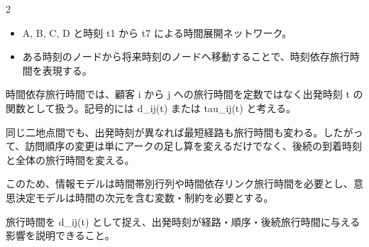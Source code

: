 

\vspace{1.5mm}

\begin{multicols}{2}

\footnotesize

\raggedcolumns


\begin{itemize}
\item A, B, C, D と時刻 t1 から t7 による時間展開ネットワーク。
\item ある時刻のノードから将来時刻のノードへ移動することで、時刻依存旅行時間を表現する。
\end{itemize}

時間依存旅行時間では、顧客 i から j への旅行時間を定数ではなく出発時刻 t の関数として扱う。記号的には d\_ij(t) または tau\_ij(t) と考える。\par

同じ二地点間でも、出発時刻が異なれば最短経路も旅行時間も変わる。したがって、訪問順序の変更は単にアークの足し算を変えるだけでなく、後続の到着時刻と全体の旅行時間を変える。\par

このため、情報モデルは時間帯別行列や時間依存リンク旅行時間を必要とし、意思決定モデルは時間の次元を含む変数・制約を必要とする。\par

旅行時間を d\_ij(t) として捉え、出発時刻が経路・順序・後続旅行時間に与える影響を説明できること。\par


\end{multicols}
